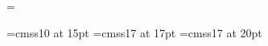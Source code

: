 

\musicparskip\parindent12mm
\bigaccid
\nopagenumbers %
\headline={\ifnum{}\else \ifodd\pageno\rightheadline \else\leftheadline\fi \fi}
\def\rightheadline{\tenrm\hfil\folio}
\def\leftheadline{\tenrm\folio\hfil}
\nostartrule
\def\writebarno{\llap{\tentt\the\barno\barnoadd}}%
\def\raisebarno{1.7\Interligne}%
\def\shiftbarno{3.0\internote}%
\def\writezbarno{}%

\font\sansseriffifteen=cmss10 at 15pt
\font\sansserifseventeen=cmss17 at 17pt
\font\sansseriftwenty=cmss17 at 20pt
\def\parttitle#1{
  \centerline{\BIGfont Neunte Symphonie}
  \hbox to \hsize{\boxit{\sansserifseventeen{#1}}\hfill\nobreak{\medtype Gustav Mahler}}%
}
\def\movement#1{
	\centerline{\sansseriftwenty #1}\smallskip
}

